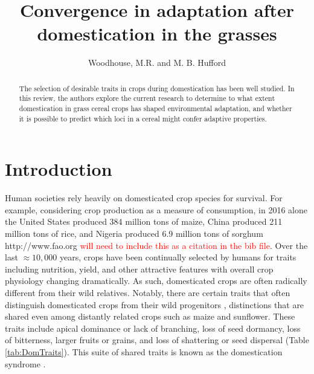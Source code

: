 \documentclass[12pt]{article}
\title{Convergence in adaptation after domestication in the grasses}
\author{Woodhouse, M.R. and M. B. Hufford}
\newcommand{\mbh}[1]{\textcolor{red}{\normalsize  #1}}
\begin{document}
\maketitle

\begin{abstract}
The selection of desirable traits in crops during domestication has been well studied. In this review, the authors explore the current research to determine to what extent domestication in grass cereal crops has shaped environmental adaptation, and whether it is possible to predict which loci in a cereal might confer adaptive properties.
\end{abstract}

\section*{Introduction}
Human societies rely heavily on domesticated crop species for survival.
For example, considering crop production as a measure of consumption, in 2016 alone the United States produced 384 million tons of maize, China produced 211 million tons of rice, and Nigeria produced 6.9 million tons of sorghum http://www.fao.org \mbh{will need to include this as a citation in the bib file}.
Over the last $\approx10,000$ years, crops have been continually selected by humans for traits including nutrition, yield, and other attractive features with overall crop physiology changing dramatically.
As such, domesticated crops are often radically different from their wild relatives.
Notably, there are certain traits that often distinguish domesticated crops from their wild progenitors \citep{Doebley2006}, distinctions that are shared even among distantly related crops such as maize and sunflower.
These traits include apical dominance or lack of branching, loss of seed dormancy, loss of bitterness, larger fruits or grains, and loss of shattering or seed dispersal (Table \ref{tab:DomTraits}).
This suite of shared traits is known as the domestication syndrome \citep{Hammer1984}.
\end{document}
